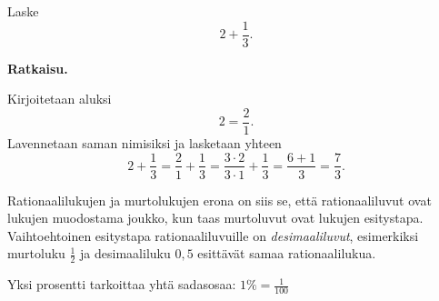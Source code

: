     
    \begin{esimerkki}
        Laske
        \[
            2 + \frac{1}{3}.
        \]
        
        \textbf{Ratkaisu.}
        
        Kirjoitetaan aluksi
        \[
            2=\frac{2}{1}.
        \]
        Lavennetaan saman nimisiksi ja lasketaan yhteen
        \[
            2 + \frac{1}{3} =
            \frac{2}{1} + \frac{1}{3} =
            \frac{3 \cdot 2}{3 \cdot 1} + \frac{1}{3} =
            \frac{6+1}{3} =
            \frac{7}{3}.
        \]
    \end{esimerkki}
    
    Rationaalilukujen ja murtolukujen erona on siis se, että rationaaliluvut
    ovat lukujen muodostama joukko, kun taas murtoluvut ovat lukujen esitystapa.
    Vaihtoehtoinen esitystapa rationaaliluvuille on \emph{desimaaliluvut},
    esimerkiksi murtoluku $\frac{1}{2}$ ja desimaaliluku $0,5$
    esittävät samaa rationaalilukua.
    
    
    Yksi prosentti tarkoittaa yhtä sadasosaa: $1 \% = \frac{1}{100}$
    

